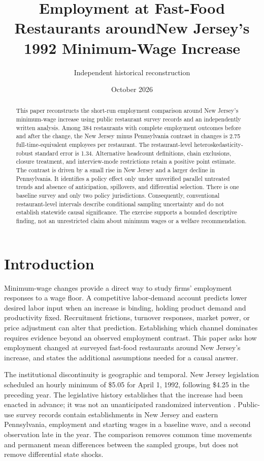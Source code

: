 \documentclass[11pt]{article}
\title{Employment at Fast-Food Restaurants around\newline New Jersey's 1992 Minimum-Wage Increase}
\author{Independent historical reconstruction}
\date{October 2026}
\newcommand{\result}[2]{#2}
\begin{document}
\maketitle
\begin{abstract}
This paper reconstructs the short-run employment comparison around New Jersey's minimum-wage increase using public restaurant survey records and an independently written analysis. Among \result{primary.n}{384} restaurants with complete employment outcomes before and after the change, the New Jersey minus Pennsylvania contrast in changes is \result{primary.estimate}{2.75} full-time-equivalent employees per restaurant. The restaurant-level heteroskedasticity-robust standard error is \result{primary.std_error}{1.34}. Alternative headcount definitions, chain exclusions, closure treatment, and interview-mode restrictions retain a positive point estimate. The contrast is driven by a small rise in New Jersey and a larger decline in Pennsylvania. It identifies a policy effect only under unverified parallel untreated trends and absence of anticipation, spillovers, and differential selection. There is one baseline survey and only two policy jurisdictions. Consequently, conventional restaurant-level intervals describe conditional sampling uncertainty and do not establish statewide causal significance. The exercise supports a bounded descriptive finding, not an unrestricted claim about minimum wages or a welfare recommendation. %
\end{abstract}

\section{Introduction}
Minimum-wage changes provide a direct way to study firms' employment responses to a wage floor. A competitive labor-demand account predicts lower desired labor input when an increase is binding, holding product demand and productivity fixed. Recruitment frictions, turnover responses, market power, or price adjustment can alter that prediction. Establishing which channel dominates requires evidence beyond an observed employment contrast. This paper asks how employment changed at surveyed fast-food restaurants around New Jersey's increase, and states the additional assumptions needed for a causal answer. %

The institutional discontinuity is geographic and temporal. New Jersey legislation scheduled an hourly minimum of \$5.05 for April 1, 1992, following \$4.25 in the preceding year. The legislative history establishes that the increase had been enacted in advance; it was not an unanticipated randomized intervention \citep{nj1990}. Public-use survey records contain establishments in New Jersey and eastern Pennsylvania, employment and starting wages in a baseline wave, and a second observation late in the year. The comparison removes common time movements and permanent mean differences between the sampled groups, but does not remove differential state shocks. %
\end{document}
